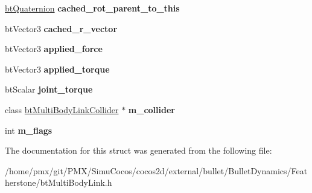 \begin{DoxyCompactItemize}
\hyperlink{classbtQuaternion}{bt\+Quaternion} {\bfseries cached\+\_\+rot\+\_\+parent\+\_\+to\+\_\+this}
\item 
\mbox{\label{structbtMultibodyLink_a8b2234e6c200f8640b36d8ad3e075b60}} 
bt\+Vector3 {\bfseries cached\+\_\+r\+\_\+vector}
\item 
\mbox{\label{structbtMultibodyLink_a47fef0b2dc0a0c42d2ad386dda76d2d0}} 
bt\+Vector3 {\bfseries applied\+\_\+force}
\item 
\mbox{\label{structbtMultibodyLink_afb9b26849d22fadb60a432161ab51a92}} 
bt\+Vector3 {\bfseries applied\+\_\+torque}
\item 
\mbox{\label{structbtMultibodyLink_a0450a199f913f2995f345d7c3be2ebc0}} 
bt\+Scalar {\bfseries joint\+\_\+torque}
\item 
\mbox{\label{structbtMultibodyLink_a4bec5a870afac33035a26024dfc6b504}} 
class \hyperlink{classbtMultiBodyLinkCollider}{bt\+Multi\+Body\+Link\+Collider} $\ast$ {\bfseries m\+\_\+collider}
\item 
\mbox{\label{structbtMultibodyLink_a8ba5d13f52212ec334dbb5c4d4484cff}} 
int {\bfseries m\+\_\+flags}
\end{DoxyCompactItemize}


The documentation for this struct was generated from the following file\+:\begin{DoxyCompactItemize}
\item 
/home/pmx/git/\+P\+M\+X/\+Simu\+Cocos/cocos2d/external/bullet/\+Bullet\+Dynamics/\+Featherstone/bt\+Multi\+Body\+Link.\+h\end{DoxyCompactItemize}
